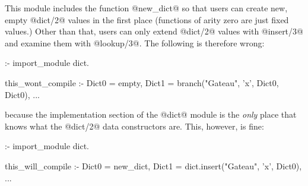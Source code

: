 This module includes the function @new_dict@ so that users can create new,
empty @dict/2@ values in the first place (functions of arity zero are just
fixed values.)
Other than that, users can only extend @dict/2@ values with @insert/3@ and
examine them with @lookup/3@.
The following is therefore wrong:
\begin{myverbatim}
:- import_module dict.

this_wont_compile :-
    Dict0 = empty,
    Dict1 = branch("Gateau", 'x', Dict0, Dict0),
    ...
\end{myverbatim}
because the implementation section of the @dict@ module is the \emph{only}
place that knows what the @dict/2@ data constructors are.  This, however, 
is fine:
\begin{myverbatim}
:- import_module dict.

this_will_compile :-
    Dict0 = new_dict,
    Dict1 = dict.insert("Gateau", 'x', Dict0),
    ...
\end{myverbatim}
